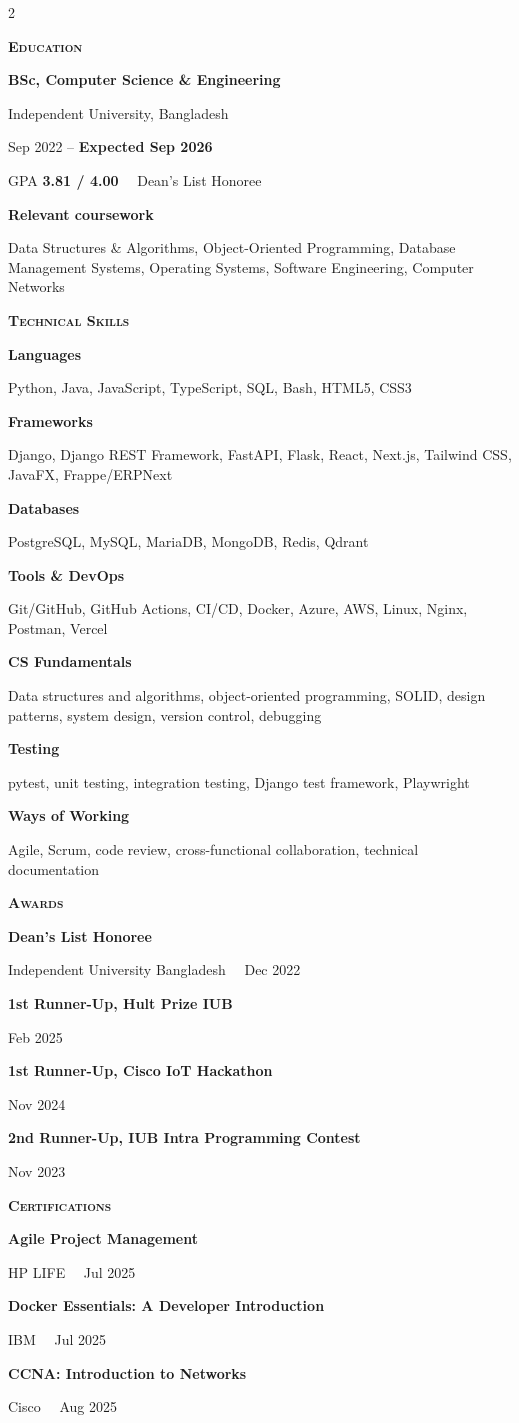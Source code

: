 \documentclass[a4paper,10pt]{article}
\newcommand{\cvsection}[1]{%
  \vspace{7pt}%
  {\color{accent}\bfseries\scshape\large #1}\par
  \vspace{1.5pt}{\color{hairline}\hrule height 0.7pt}\vspace{5pt}}
\newcommand{\skillgroup}[2]{%
  {\bfseries\small #1}\par{\small #2}\par\vspace{4pt}}
\newcommand{\award}[2]{%
  {\small\bfseries #1}\par{\footnotesize\color{soft} #2}\par\vspace{3.5pt}}
\newcommand{\dotsep}{\ \textperiodcentered\ }
\begin{document}
\begin{paracol}{2}
\switchcolumn

\cvsection{Education}
{\bfseries BSc, Computer Science \& Engineering}\par
{\small\color{accent} Independent University, Bangladesh}\par
{\small Sep 2022 -- \textbf{Expected Sep 2026}}\par
{\small GPA \textbf{3.81 / 4.00} \dotsep Dean's List Honoree}\par\vspace{3pt}
{\footnotesize\bfseries Relevant coursework}\par
{\footnotesize Data Structures \& Algorithms, Object-Oriented Programming, Database Management Systems,
Operating Systems, Software Engineering, Computer Networks}

\cvsection{Technical Skills}
\skillgroup{Languages}{Python, Java, JavaScript, TypeScript, SQL, Bash, HTML5, CSS3}
\skillgroup{Frameworks}{Django, Django REST Framework, FastAPI, Flask, React, Next.js, Tailwind CSS, JavaFX, Frappe/ERPNext}
\skillgroup{Databases}{PostgreSQL, MySQL, MariaDB, MongoDB, Redis, Qdrant}
\skillgroup{Tools \& DevOps}{Git/GitHub, GitHub Actions, CI/CD, Docker, Azure, AWS, Linux, Nginx, Postman, Vercel}
\skillgroup{CS Fundamentals}{Data structures and algorithms, object-oriented programming, SOLID, design patterns, system design, version control, debugging}
\skillgroup{Testing}{pytest, unit testing, integration testing, Django test framework, Playwright}
\skillgroup{Ways of Working}{Agile, Scrum, code review, cross-functional collaboration, technical documentation}

\cvsection{Awards}
\award{Dean's List Honoree}{Independent University Bangladesh \dotsep Dec 2022}
\award{1st Runner-Up, Hult Prize IUB}{Feb 2025}
\award{1st Runner-Up, Cisco IoT Hackathon}{Nov 2024}
\award{2nd Runner-Up, IUB Intra Programming Contest}{Nov 2023}

\cvsection{Certifications}
\award{Agile Project Management}{HP LIFE \dotsep Jul 2025}
\award{Docker Essentials: A Developer Introduction}{IBM \dotsep Jul 2025}
\award{CCNA: Introduction to Networks}{Cisco \dotsep Aug 2025}

\end{paracol}
\end{document}

